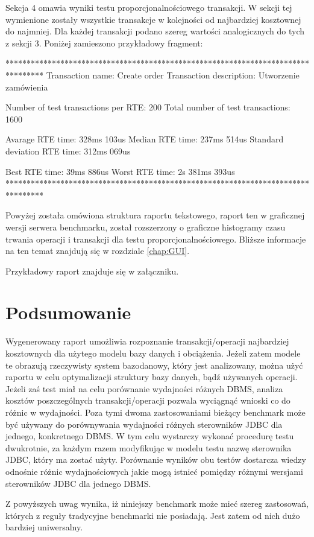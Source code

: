 Sekcja 4 omawia wyniki testu proporcjonalnościowego transakcji. W sekcji tej wymienione zostały
wszystkie transakcje w kolejności od najbardziej kosztownej do najmniej. Dla każdej transakcji 
podano szereg wartości analogicznych do tych z sekcji 3. Poniżej zamieszono przykładowy fragment:
\begin{codeblock}
*********************************************************************************
Transaction name:        Create order
Transaction description: Utworzenie zamówienia

Number of test transactions per RTE:   200
Total number of test transactions:     1600

Avarage RTE time:                 328ms 103us
Median RTE time:                  237ms 514us
Standard deviation RTE time:      312ms 069us

Best RTE time:                     39ms 886us
Worst RTE time:                2s 381ms 393us
*********************************************************************************
\end{codeblock}

Powyżej została omówiona struktura raportu tekstowego, raport ten w graficznej wersji serwera benchmarku, 
został rozszerzony o graficzne histogramy czasu trwania operacji i transakcji dla
testu proporcjonalnościowego. Bliższe informacje na ten temat znajdują się w rozdziale \ref{chap:GUI}.

Przykładowy raport znajduje się w załączniku.

\section{Podsumowanie}
Wygenerowany raport umożliwia rozpoznanie transakcji/operacji najbardziej kosztownych dla
użytego modelu bazy danych i obciążenia. Jeżeli zatem modele te obrazują rzeczywisty 
system bazodanowy, który jest analizowany, można użyć raportu w celu optymalizacji
struktury bazy danych, bądź używanych operacji. Jeżeli zaś test miał na celu porównanie
wydajności różnych DBMS, analiza kosztów poszczególnych transakcji/operacji pozwala
wyciągnąć wnioski co do różnic w wydajności. Poza tymi dwoma zastosowaniami bieżący benchmark
może być używany do porównywania wydajności różnych sterowników JDBC dla jednego,
konkretnego DBMS. W tym celu wystarczy wykonać procedurę testu dwukrotnie, za każdym
razem modyfikując w modelu testu nazwę sterownika JDBC, który ma zostać użyty. Porównanie
wyników obu testów dostarcza wiedzy odnośnie różnic wydajnościowych jakie mogą istnieć pomiędzy
różnymi wersjami sterowników JDBC dla jednego DBMS.

Z powyższych uwag wynika, iż niniejszy benchmark może mieć szereg zastosowań, których 
z reguły tradycyjne benchmarki nie posiadają. Jest zatem od nich dużo bardziej uniwersalny.
